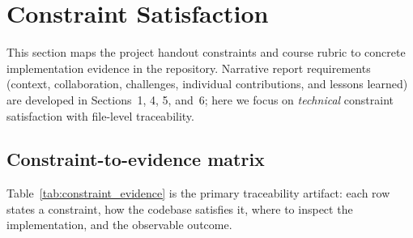 \section{Constraint Satisfaction}

This section maps the project handout constraints and course rubric to concrete implementation evidence in the repository. Narrative report requirements (context, collaboration, challenges, individual contributions, and lessons learned) are developed in Sections~1, 4, 5, and~6; here we focus on \emph{technical} constraint satisfaction with file-level traceability.

\subsection{Constraint-to-evidence matrix}
Table~\ref{tab:constraint_evidence} is the primary traceability artifact: each row states a constraint, how the codebase satisfies it, where to inspect the implementation, and the observable outcome.

